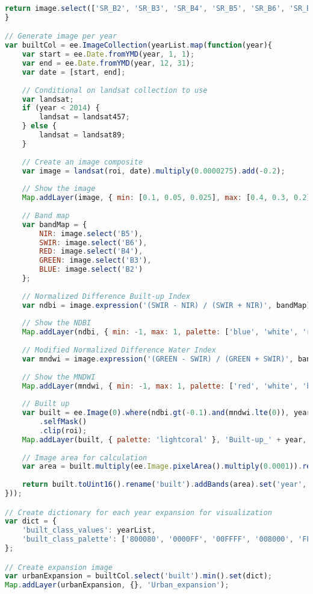 \begin{lstlisting}[language=JavaScript, label={code:expansion}, caption={GEE Script to Model Urban Expansion}]
	return image.select(['SR_B2', 'SR_B3', 'SR_B4', 'SR_B5', 'SR_B6', 'SR_B7'], ['B2', 'B3', 'B4', 'B5', 'B6', 'B7']).updateMask(mask);
}

// Generate image per year
var builtCol = ee.ImageCollection(yearList.map(function(year){
	var start = ee.Date.fromYMD(year, 1, 1);
	var end = ee.Date.fromYMD(year, 12, 31);
	var date = [start, end];
	
	// Conditional on landsat collection to use
	var landsat;
	if (year < 2014) {
		landsat = landsat457;
	} else {
		landsat = landsat89;
	}
	
	// Create an image composite
	var image = landsat(roi, date).multiply(0.0000275).add(-0.2);
	
	// Show the image
	Map.addLayer(image, { min: [0.1, 0.05, 0.025], max: [0.4, 0.3, 0.2], bands: ['B5', 'B6', 'B7'] }, 'Landsat_' + year, false);
	
	// Band map
	var bandMap = { 
		NIR: image.select('B5'), 
		SWIR: image.select('B6'), 
		RED: image.select('B4'), 
		GREEN: image.select('B3'), 
		BLUE: image.select('B2') 
	};
	
	// Normalized Difference Built-up Index
	var ndbi = image.expression('(SWIR - NIR) / (SWIR + NIR)', bandMap).rename('NDBI');
	
	// Show the NDBI
	Map.addLayer(ndbi, { min: -1, max: 1, palette: ['blue', 'white', 'red'] }, 'NDBI_' + year, false);
	
	// Modified Normalized Difference Water Index
	var mndwi = image.expression('(GREEN - SWIR) / (GREEN + SWIR)', bandMap).rename('MNDWI');
	
	// Show the MNDWI
	Map.addLayer(mndwi, { min: -1, max: 1, palette: ['red', 'white', 'blue'] }, 'MNDWI_' + year, false);
	
	// Built up
	var built = ee.Image(0).where(ndbi.gt(-0.1).and(mndwi.lte(0)), year)
		.selfMask()
		.clip(roi);
	Map.addLayer(built, { palette: 'lightcoral' }, 'Built-up_' + year, false);
	
	// Image area for calculation
	var area = built.multiply(ee.Image.pixelArea().multiply(0.0001)).rename('area');
	
	return built.toUint16().rename('built').addBands(area).set('year', year, 'system:time_start', start);
}));

// Create dictionary for each year expansion for visualization
var dict = {
	'built_class_values': yearList,
	'built_class_palette': ['800080', '0000FF', '00FFFF', '008000', 'FFFF00', 'FFA500', 'FF0000']
};

// Create expansion image
var urbanExpansion = builtCol.select('built').min().set(dict);
Map.addLayer(urbanExpansion, {}, 'Urban_expansion');


\end{lstlisting}

